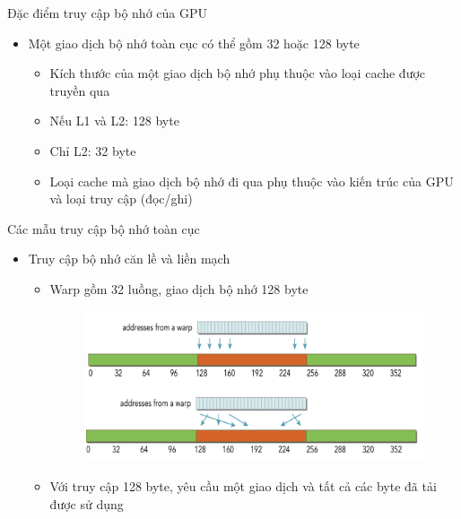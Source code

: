 \documentclass[10pt]{beamer}
\theoremstyle{remark}
\numberwithin{algocf}{section}
\numberwithin{equation}{section}
\numberwithin{dl}{section}
\numberwithin{figure}{section}
\begin{document}
\begin{frame}{Đặc điểm truy cập bộ nhớ của GPU}
    \begin{itemize}
        \item Một giao dịch bộ nhớ toàn cục có thể gồm 32 hoặc 128 byte
        \begin{itemize}
            \item Kích thước của một giao dịch bộ nhớ phụ thuộc vào loại cache được truyền qua
            \item Nếu L1 và L2: 128 byte
            \item Chỉ L2: 32 byte
            \item Loại cache mà giao dịch bộ nhớ đi qua phụ thuộc vào kiến trúc của GPU và loại truy cập (đọc/ghi)
        \end{itemize}
    \end{itemize}
\end{frame}

\begin{frame}{Các mẫu truy cập bộ nhớ toàn cục}
    \begin{itemize}
        \item Truy cập bộ nhớ căn lề và liền mạch
        \begin{itemize}
            \item Warp gồm 32 luồng, giao dịch bộ nhớ 128 byte
            \begin{figure}[H]
                \centering
                \includegraphics[width=0.7\linewidth]{figures/CUDA/Aligned_Coalesced_Global_Memory_Transaction.png}
            \end{figure}
            \item Với truy cập 128 byte, yêu cầu một giao dịch và tất cả các byte đã tải được sử dụng
        \end{itemize}
    \end{itemize}
\end{frame}
\end{document}

